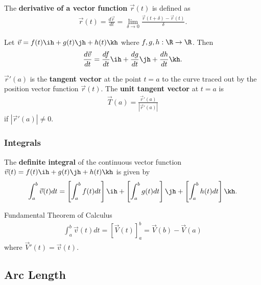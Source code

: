 \documentclass{article}
\begin{document}
\begin{definition}
    The \textbf{derivative of a vector function} $\vec r(t)$ is defined as
    \begin{align*}
        \vec r(t) = \frac{d\vec r}{dt} = \lim_{\delta \to 0} \frac{\vec r(t+\delta)-\vec r(t)}{\delta}.
    \end{align*}
\end{definition}
\begin{theorem}
    Let $\vec v = f(t)\ih + g(t)\jh + h(t)\kh$ where $f,g,h: \R\to\R$. Then
    \begin{align*}
        \frac{d\vec v}{dt} = \frac{df}{dt}\ih + \frac{dg}{dt}\jh + \frac{dh}{dt}\kh.
    \end{align*}
\end{theorem}
\begin{definition}
    $\vec r'(a)$ is the \textbf{tangent vector} at the point $t=a$ to the curve traced out by the position vector function $\vec r(t)$.
    The \textbf{unit tangent vector} at $t=a$ is
    \begin{align*}
        \vec T(a) = \frac{\vec r'(a)}{|\vec r'(a)|}
    \end{align*}
    if $|\vec r'(a)| \not= 0$.
\end{definition}

\subsubsection{Integrals}

\begin{definition}
    The \textbf{definite integral} of the continuous vector function $\vec v(t)=f(t)\ih + g(t)\jh + h(t)\kh$ is given by
    \begin{align*}
        \int_a^b \vec v(t)dt = \left[\int_a^b f(t)dt\right]\ih + \left[\int_a^b g(t) dt\right]\jh + \left[\int_a^b h(t)dt\right] \kh.
    \end{align*}
\end{definition}
\begin{theorem}{Fundamental Theorem of Calculus}
    \begin{align*}
        \int_a^b \vec v(t) dt = \left[\vec V(t)\right]^b_a = \vec V(b) - \vec V(a)
    \end{align*}
    where $\vec V'(t) = \vec v(t)$.
\end{theorem}


\subsection{Arc Length}
\end{document}
